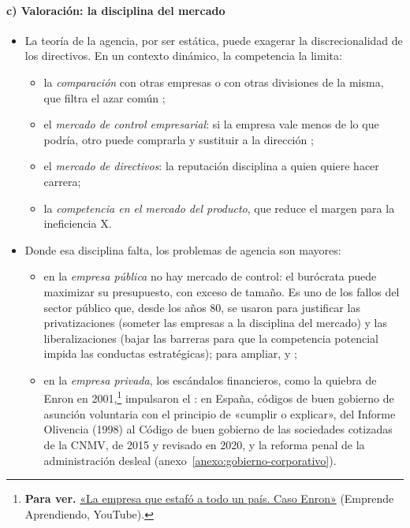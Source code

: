 \documentclass[11pt]{article}
\begin{document}
\paragraph{c) Valoración: la disciplina del mercado}

\begin{itemize}
\item La teoría de la agencia, por ser estática, puede exagerar la discrecionalidad de los directivos. En un contexto dinámico, la competencia la limita:
  \begin{itemize}
  \item la \emph{comparación} con otras empresas o con otras divisiones de la misma, que filtra el azar común ;
  \item el \emph{mercado de control empresarial}: si la empresa vale menos de lo que podría, otro puede comprarla y sustituir a la dirección\nocite{Manne1965Mergers} ;
  \item el \emph{mercado de directivos}: la reputación disciplina a quien quiere hacer carrera\nocite{Fama1980Agency,Holmstrom1999Managerial};
  \item la \emph{competencia en el mercado del producto}, que reduce el margen para la ineficiencia X.
  \end{itemize}
\item Donde esa disciplina falta, los problemas de agencia son mayores:
  \begin{itemize}
  \item en la \emph{empresa pública} no hay mercado de control: el burócrata puede maximizar su presupuesto, con exceso de tamaño\nocite{Niskanen1971Bureaucracy}. Es uno de los fallos del sector público  que, desde los años 80, se usaron para justificar las privatizaciones (someter las empresas a la disciplina del mercado) y las liberalizaciones (bajar las barreras para que la competencia potencial impida las conductas estratégicas); para ampliar,  y ;
  \item en la \emph{empresa privada}, los escándalos financieros, como la quiebra de Enron en 2001\nocite{HealyPalepu2003Fall},\footnote{\textbf{Para ver.} \href{https://www.youtube.com/watch?v=Lt1zwv1iD4M}{«La empresa que estafó a todo un país. Caso Enron»} (Emprende Aprendiendo, YouTube).} impulsaron el : en España, códigos de buen gobierno de asunción voluntaria con el principio de «cumplir o explicar», del Informe Olivencia (1998) al Código de buen gobierno de las sociedades cotizadas de la CNMV, de 2015 y revisado en 2020\nocite{CNMV1998Olivencia,CNMV2020CBG}, y la reforma penal de la administración desleal\nocite{BOE2015LO1} (anexo~\ref{anexo:gobierno-corporativo}).
  \end{itemize}
\end{itemize}
\end{document}
